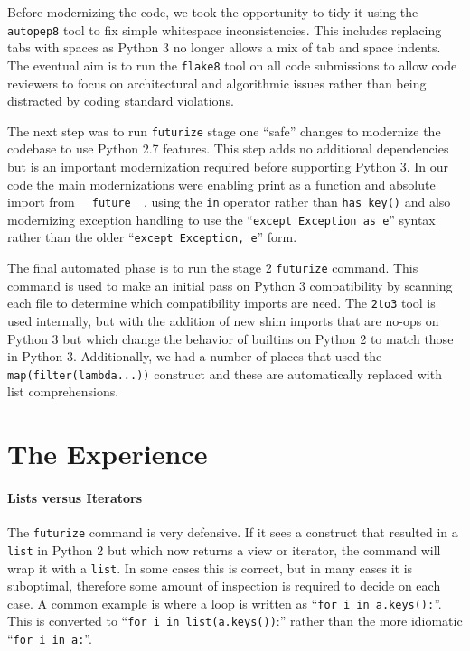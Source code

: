\documentclass[11pt,twoside]{article}
\begin{document}
Before modernizing the code, we took the opportunity to tidy it using the \texttt{autopep8} tool to fix simple whitespace inconsistencies.
This includes replacing tabs with spaces as Python 3 no longer allows a mix of tab and space indents.
The eventual aim is to run the \texttt{flake8} tool on all code submissions to allow code reviewers to focus on architectural and algorithmic issues rather than being distracted by coding standard violations.

The next step was to run \texttt{futurize} stage one ``safe'' changes to modernize the codebase to use Python 2.7 features.
This step adds no additional dependencies but is an important modernization required before supporting Python 3.
In our code the main modernizations were enabling print as a function and absolute import from \texttt{\_\_future\_\_}, using the \texttt{in} operator rather than \texttt{has\_key()} and also modernizing exception handling to use the ``\texttt{except Exception as e}'' syntax rather than the older ``\texttt{except Exception, e}'' form.

The final automated phase is to run the stage 2 \texttt{futurize} command.
This command is used to make an initial pass on Python 3 compatibility by scanning each file to determine which compatibility imports are need.
The \texttt{2to3} tool is used internally, but with the addition of new shim imports that are no-ops on Python 3 but which change the behavior of builtins on Python 2 to match those in Python 3.
Additionally, we had a number of places that used the \texttt{map(filter(lambda...))} construct and these are automatically replaced with list comprehensions.

\section{The Experience}

\paragraph{Lists versus Iterators}

The \texttt{futurize} command is very defensive.
If it sees a construct that resulted in a \texttt{list} in Python 2 but which now returns a view or iterator, the command will wrap it with a \texttt{list}.
In some cases this is correct, but in many cases it is suboptimal, therefore some amount of inspection is required to decide on each case.
A common example is where a loop is written as ``\texttt{for i in a.keys():}''.
This is converted to ``\texttt{for i in list(a.keys())}:'' rather than the more idiomatic ``\texttt{for i in a:}''.
\end{document}

